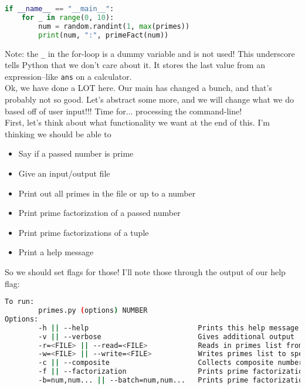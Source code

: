 \documentclass[12pt]{article}
\begin{document}
\begin{lstlisting}[language=Python]
if __name__ == "__main__":
    for _ in range(0, 10):
        num = random.randint(1, max(primes))
        print(num, ":", primeFact(num))
\end{lstlisting}
Note: the \texttt{\_} in the for-loop is a dummy variable and is not used! This underscore tells Python that we don't care about it. It stores the last value from an expression--like \texttt{ans} on a calculator.\\
Ok, we have done a LOT here. Our main has changed a bunch, and that's probably not so good. Let's abstract some more, and we will change what we do based off of user input!!! Time for... processing the command-line!\\
First, let's think about what functionality we want at the end of this. I'm thinking we should be able to
\begin{itemize} \item Say if a passed number is prime\end{itemize}
\begin{itemize} \item Give an input/output file\end{itemize}
\begin{itemize} \item Print out all primes in the file or up to a number\end{itemize}
\begin{itemize} \item Print prime factorization of a passed number\end{itemize}
\begin{itemize} \item Print prime factorizations of a tuple\end{itemize}
\begin{itemize} \item Print a help message\end{itemize}
So we should set flags for those! I'll note those through the output of our help flag:\\
\begin{lstlisting}[language=sh]
To run:
        primes.py (options) NUMBER
Options:
        -h || --help                          Prints this help message
        -v || --verbose                       Gives additional output
        -r=<FILE> || --read=<FILE>            Reads in primes list from specified file (JSON)
        -w=<FILE> || --write=<FILE>           Writes primes list to specified file (JSON)
        -c || --composite                     Collects composite numbers also
        -f || --factorization                 Prints prime factorization of NUMBER
        -b=num,num... || --batch=num,num...   Prints prime factorization of num,num,num...
\end{lstlisting}
\end{document}
